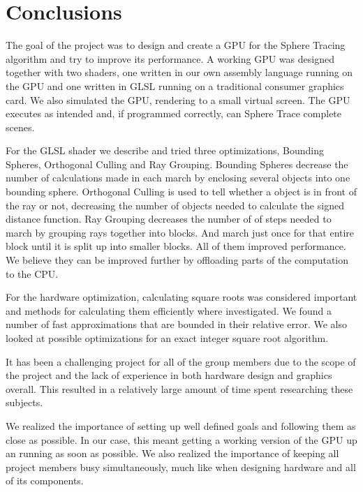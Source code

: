\chapter{Conclusions}

	The goal of the project was to design and create a GPU for the Sphere Tracing
	algorithm and try to improve its performance. A working GPU was designed
	together with two shaders, one written in our own assembly language running
	on the GPU and one written in GLSL running on a traditional consumer graphics
	card. We also simulated the GPU, rendering to a small virtual screen. The GPU
	executes as intended and, if programmed correctly, can Sphere Trace complete
	scenes.
	
	For the GLSL shader we describe and tried three optimizations, Bounding Spheres, 
	Orthogonal Culling and Ray Grouping. Bounding Spheres decrease the number of 
	calculations made in each march by enclosing several objects into one bounding 
	sphere. Orthogonal Culling is used to tell whether a object is in front of the ray 
	or not, decreasing the number of objects needed to calculate the signed distance
	function. Ray Grouping decreases the number of of steps needed to march by grouping 
	rays together into blocks. And march just once for that entire block until it is split 
	up into smaller blocks. All of them improved performance. We believe they can be 
	improved further by offloading parts of the computation to the CPU.
	
	For the hardware optimization, calculating square roots was considered
	important and methods for calculating them efficiently where investigated. We
	found a number of fast approximations that are bounded in their relative
	error. We also looked at possible optimizations for an exact integer square
	root algorithm.
	
	It has been a challenging project for all of the group members due to the
	scope of the project and the lack of experience in both hardware design and
	graphics overall. This resulted in a relatively large amount of time spent
	researching these subjects.

	We realized the importance of setting up well defined goals and following
	them as close as possible. In our case, this meant getting a working version
	of the GPU up an running as soon as possible. We also realized the importance
	of keeping all project members busy simultaneously, much like when designing
	hardware and all of its components.
